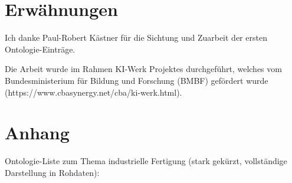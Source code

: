 \documentclass{article}
\begin{document}
\section{Erwähnungen}

Ich danke Paul-Robert Kästner für die Sichtung und Zuarbeit der ersten Ontologie-Einträge.

Die Arbeit wurde im Rahmen KI-Werk Projektes durchgeführt, welches vom Bundesministerium für Bildung und Forschung (BMBF) gefördert wurde (https://www.cbasynergy.net/cba/ki-werk.html).

\newpage

\section{Anhang}

Ontologie-Liste zum Thema industrielle Fertigung (stark gekürzt, vollständige Darstellung in Rohdaten):
\end{document}
